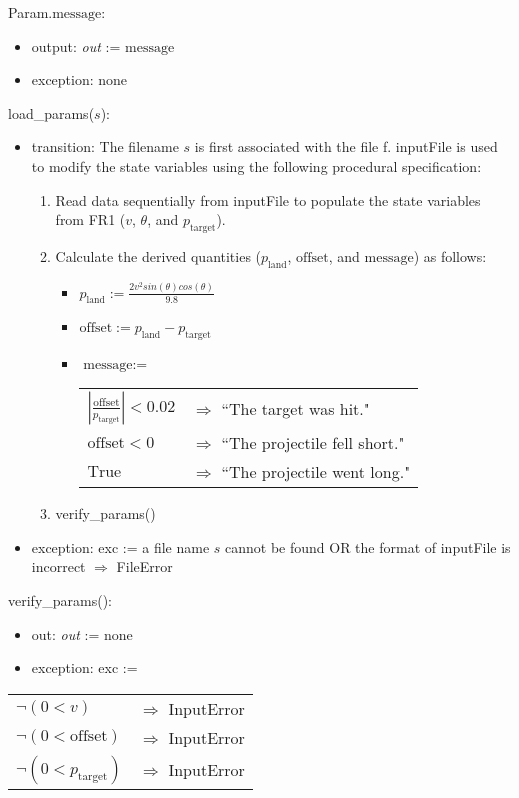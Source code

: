 \documentclass[12pt, titlepage]{article}
\begin{document}
\noindent Param.$\text{message}$:
\begin{itemize}
\item output: \textit{out} := $\text{message}$
\item exception: none
\end{itemize}

\noindent load\_params($s$):
\begin{itemize}
\item transition: The filename $s$ is first associated with the file f. 
{inputFile} is used to modify the state variables using the following procedural 
specification:
\begin{enumerate}
\item Read data sequentially from inputFile to populate the state variables from
  FR1 ($v$, $\theta$, and $p_{\text{target}}$).
\item Calculate the derived quantities ($p_{\text{land}}$, $\text{offset}$, and $
\text{message}$) as follows:
\begin{itemize}
\item $p_{\text{land}} := \frac{2 v^2 sin(\theta) cos(\theta)}{9.8}$
\item $\text{offset} := p_{\text{land}} - p_{\text{target}} $
\item $\text{message} := $
\begin{longtable*}[l]{l l} 
$|\frac{\text{offset}}{p_{\text{target}}}| < 0.02$ & $\Rightarrow$ ``The target was hit."\\
$\text{offset} < 0$ & $\Rightarrow$ ``The projectile fell short."\\
$\text{True}$ & $\Rightarrow$ ``The projectile went long."\\
\end{longtable*}
\end{itemize}
\item verify\_params()
\end{enumerate}

\item exception: exc := a file name $s$ cannot be found OR the format of
  inputFile is incorrect $\Rightarrow$  FileError
\end{itemize}

\noindent verify\_params():
\begin{itemize}
\item out: \textit{out} := none
\item exception: exc := 
\end{itemize}
\noindent \begin{longtable*}[l]{l l} 
$\neg (0 < v)$ & $\Rightarrow$ InputError\\
$\neg (0 < \text{offset})$ & $\Rightarrow$ InputError\\
$\neg (0 < p_{\text{target}})$ & $\Rightarrow$ InputError\\
\end{longtable*}
\end{document}
